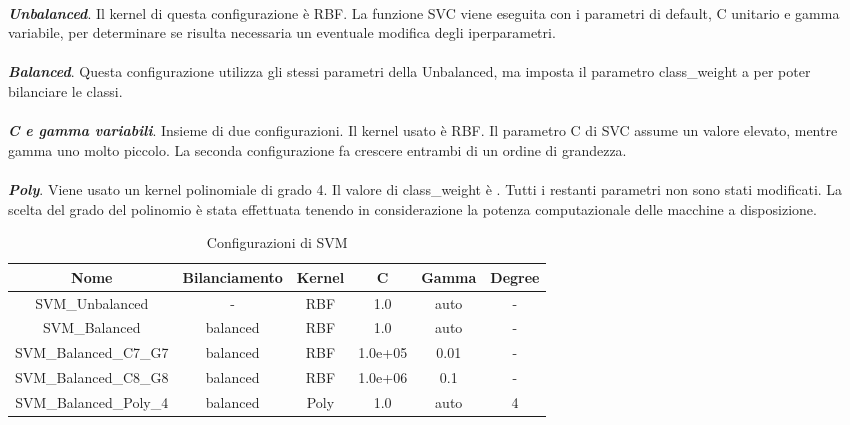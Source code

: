 \documentclass[12pt,a4paper,oneside,hidelinks]{report}
\begin{document}
\paragraph*{}
\textbf{\textit{Unbalanced}}. Il kernel di questa configurazione è RBF. La funzione SVC viene eseguita con i parametri di default, C unitario e gamma variabile, per determinare se risulta necessaria un eventuale modifica degli iperparametri.

\paragraph*{}
\textbf{\textit{Balanced}}. Questa configurazione utilizza gli stessi parametri della Unbalanced, ma imposta il parametro class\_weight a  per poter bilanciare le classi.

\paragraph*{}
\textbf{\textit{C e gamma variabili}}. Insieme di due configurazioni. Il kernel usato è RBF. Il parametro C di SVC assume un valore elevato, mentre gamma uno molto piccolo. La seconda configurazione fa crescere entrambi di un ordine di grandezza.

\paragraph*{}
\textbf{\textit{Poly}}. Viene usato un kernel polinomiale di grado 4. Il valore di class\_weight è . Tutti i restanti parametri non sono stati modificati. La scelta del grado del polinomio è stata effettuata tenendo in considerazione la potenza computazionale delle macchine a disposizione.

\begin{table}[ht]%
\centering
\caption{Configurazioni di SVM}\label{tab:b2}
\begin{tabular}{|c|c|c|S[table-parse-only = true]|S[table-parse-only = true]|c|}
\hline
Nome                    & Bilanciamento & Kernel & C        & Gamma & Degree    \\ 
\hline 
SVM\_Unbalanced         & -             & RBF    & 1.0      & auto    & -       \\
\hline 
SVM\_Balanced           & balanced      & RBF    & 1.0      & auto    & -       \\
\hline 
SVM\_Balanced\_C7\_G7   & balanced      & RBF    & 1.0e+05  & 0.01    & -       \\
\hline 
SVM\_Balanced\_C8\_G8   & balanced      & RBF    & 1.0e+06  & 0.1     & -       \\
\hline 
SVM\_Balanced\_Poly\_4  & balanced      & Poly   & 1.0      & auto    & 4       \\
\hline 
\end{tabular} 
\end{table}
\end{document}
